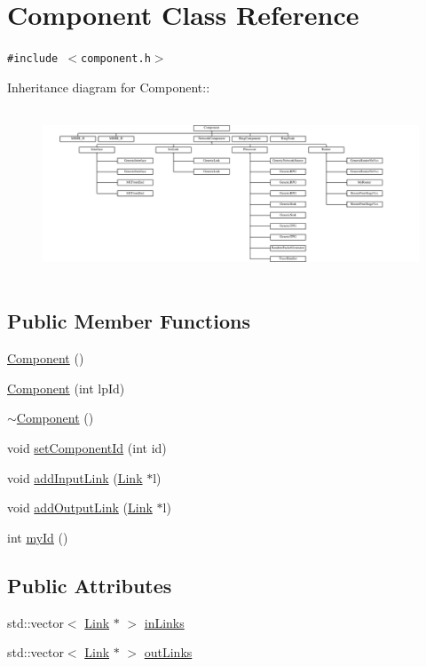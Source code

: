 \hypertarget{classComponent}{
\section{Component Class Reference}
\label{classComponent}
}
{\tt \#include $<$component.h$>$}

Inheritance diagram for Component::\begin{figure}[H]
\begin{center}
\leavevmode
\includegraphics[height=5.05556cm]{classComponent}
\end{center}
\end{figure}
\subsection*{Public Member Functions}
\begin{CompactItemize}
\item 
\hyperlink{classComponent_8775db6d1a2c1afc2e77cd3c8f39da6f}{Component} ()
\item 
\hyperlink{classComponent_52f5a349d8ed4bd7efd4c8ee381a0ed8}{Component} (int lpId)
\item 
\hyperlink{classComponent_b8378fa275af98e568a7e91d33d867af}{$\sim$Component} ()
\item 
void \hyperlink{classComponent_4a5ca86f7a92e163287c4aae16f6b4b2}{setComponentId} (int id)
\item 
void \hyperlink{classComponent_9c7c91fe01f0d204cbc79b597d8236fe}{addInputLink} (\hyperlink{classLink}{Link} $\ast$l)
\item 
void \hyperlink{classComponent_aed97b38bbc44deddf329aa473e23b25}{addOutputLink} (\hyperlink{classLink}{Link} $\ast$l)
\item 
int \hyperlink{classComponent_af44955457bc84fa39a346ee70db916f}{myId} ()
\end{CompactItemize}
\subsection*{Public Attributes}
\begin{CompactItemize}
\item 
std::vector$<$ \hyperlink{classLink}{Link} $\ast$ $>$ \hyperlink{classComponent_6c43e56775c15cfcc1c0e8a6cbc7c474}{inLinks}
\item 
std::vector$<$ \hyperlink{classLink}{Link} $\ast$ $>$ \hyperlink{classComponent_4f715c718ecdb440f200e954b5d35b10}{outLinks}
\end{CompactItemize}


